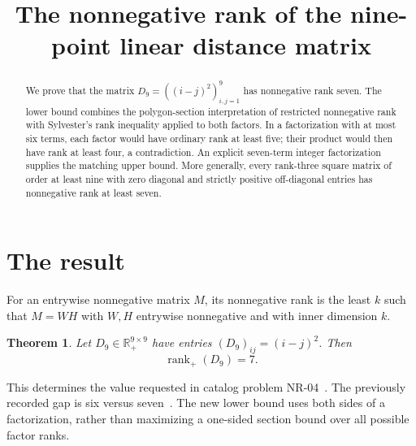\documentclass[11pt]{article}
\title{The nonnegative rank of the nine-point linear distance matrix}
\author{}\date{}
\newtheorem{theorem}{Theorem}
\newcommand{\rank}{\operatorname{rank}}
\newcommand{\R}{\mathbb R}
\begin{document}
\maketitle
\begin{abstract}
We prove that the matrix $D_9=((i-j)^2)_{i,j=1}^9$ has nonnegative rank seven. The lower bound combines the polygon-section interpretation of restricted nonnegative rank with Sylvester's rank inequality applied to both factors. In a factorization with at most six terms, each factor would have ordinary rank at least five; their product would then have rank at least four, a contradiction. An explicit seven-term integer factorization supplies the matching upper bound. More generally, every rank-three square matrix of order at least nine with zero diagonal and strictly positive off-diagonal entries has nonnegative rank at least seven.
\end{abstract}

\section{The result}
For an entrywise nonnegative matrix $M$, its nonnegative rank is the least $k$ such that $M=WH$ with $W,H$ entrywise nonnegative and with inner dimension $k$.
\begin{theorem}\label{thm:main}
Let $D_9\in\R_+^{9\times9}$ have entries $(D_9)_{ij}=(i-j)^2$. Then
\[
 \boxed{\rank_+(D_9)=7.}
\]
\end{theorem}
This determines the value requested in catalog problem NR-04~\cite{catalog}. The previously recorded gap is six versus seven~\cite{gg,bvg}. The new lower bound uses both sides of a factorization, rather than maximizing a one-sided section bound over all possible factor ranks.
\end{document}

